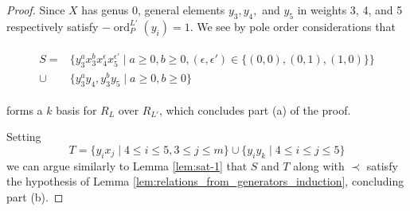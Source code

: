 \documentclass{amsart}
\theoremstyle{plain}
\theoremstyle{definition}
\theoremstyle{remark}
\numberwithin{equation}{section}
\DeclareMathOperator{\ord}{ord}
\newcommand{\halfcan}{L}
\DeclareMathOperator{\initial}{in_\prec}
\begin{document}
\begin{proof}
Since $X$ has genus 0, general
elements $y_3, y_4,$ and $y_5$ in weights 3, 4, and 5 respectively satisfy $-\ord_P^{\halfcan'}(y_i) =
1$. We see by pole order considerations that

\begin{align}
\label{eqn:add_one_generator}
	\begin{split}
		S=	&\{ y_3^ax_3^b x_4^\epsilon x_5^{\epsilon'} \mid a \geq 0, b 
		\geq 0,(\epsilon,\epsilon') \in \{(0,0),(0,1),(1,0)\} \} \\
		\cup \;&\{y_3^ay_4, y_3^by_5 \mid a \geq 0, b \geq 0 \}
	\end{split}
\end{align}

\noindent forms a $k$ basis for $R_\halfcan$ over $R_{\halfcan'}$, which concludes part (a) of the proof.

Setting
\[
	T = \{ y_i x_j \mid 4 \leq i \leq 5, 3 \leq j \leq m\} \cup \{ y_i y_k \mid 4 \leq i \leq j \leq 5\} 
\]
we can argue similarly to Lemma \ref{lem:sat-1} that $S$ and $T$ along with $\prec$ satisfy the hypothesis of Lemma \ref{lem:relations_from_generators_induction}, concluding part (b).



%
%
%
%
%
%


\end{proof}
\end{document}
